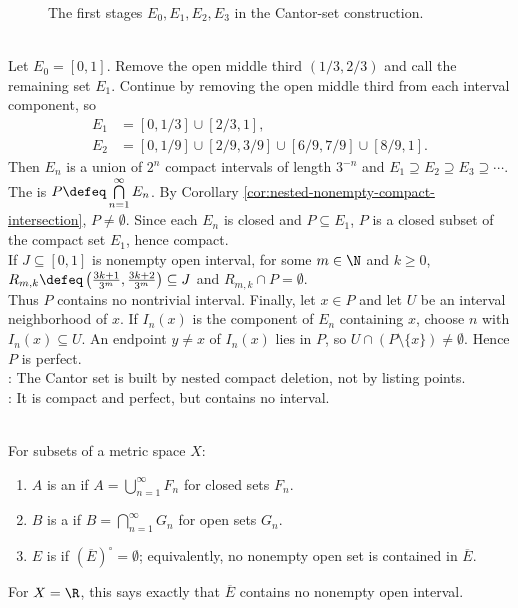 \begin{figure}[H]
  \centering
  
  \caption{The first stages $E_0,E_1,E_2,E_3$ in the Cantor-set construction.}
  \label{fig:cantor-set-first-stages}
\end{figure}

\begin{example} \label{ex:cantor-set} \\
Let $E_0=[0,1]$. Remove the open middle third $(1/3,2/3)$ and call the remaining set $E_1$. Continue by removing the open middle third from each interval component, so
\begin{align}
E_1&=[0,1/3]\cup[2/3,1], \nonumber\\
E_2&=[0,1/9]\cup[2/9,3/9]\cup[6/9,7/9]\cup[8/9,1]. \nonumber
\end{align}
Then $E_n$ is a union of $2^n$ compact intervals of length $3^{-n}$ and $E_1\supseteq E_2\supseteq E_3\supseteq\cdots$.\\
The  is $P\defeq\bigcap\limits_{n=1}^{\infty}E_n$. By Corollary \ref{cor:nested-nonempty-compact-intersection}, $P\neq\emptyset$. Since each $E_n$ is closed and $P\subseteq E_1$, $P$ is a closed subset of the compact set $E_1$, hence compact.\\
If $J\subseteq[0,1]$ is nonempty open interval, for some $m\in\N$ and $k\geq0$, $R_{m,k}\defeq\left(\frac{3k+1}{3^m},\frac{3k+2}{3^m}\right)\subseteq J$ and $R_{m,k}\cap P=\emptyset$.\\
Thus $P$ contains no nontrivial interval. Finally, let $x\in P$ and let $U$ be an interval neighborhood of $x$. If $I_n(x)$ is the component of $E_n$ containing $x$, choose $n$ with $I_n(x)\subseteq U$. An endpoint $y\neq x$ of $I_n(x)$ lies in $P$, so $U\cap(P\setminus\{x\})\neq\emptyset$. Hence $P$ is perfect.\\
: The Cantor set is built by nested compact deletion, not by listing points.\\
: It is compact and perfect, but contains no interval.
\end{example}

\begin{definition} \label{def:fsigma-gdelta-nowhere-dense} \\
For subsets of a metric space $X$:
\begin{enumerate}[label=(\roman*)]
\setlength{\itemsep}{0pt}
\item $A$ is an  if $A=\bigcup_{n=1}^{\infty}F_n$ for closed sets $F_n$.
\item $B$ is a  if $B=\bigcap_{n=1}^{\infty}G_n$ for open sets $G_n$.
\item $E$ is  if $(\overline{E})^\circ=\emptyset$; equivalently, no nonempty open set is contained in $\overline{E}$.
\end{enumerate}
For $X=\R$, this says exactly that $\overline{E}$ contains no nonempty open interval.
\end{definition}

